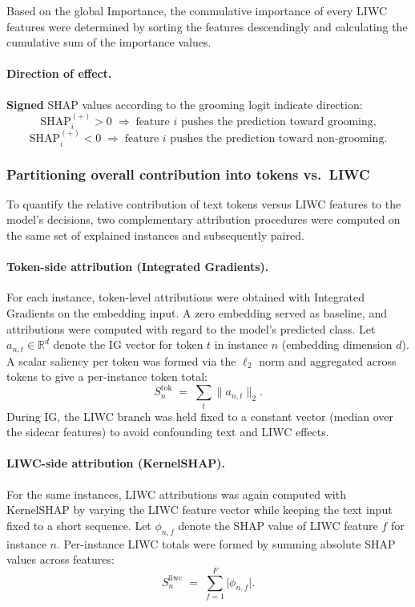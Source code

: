 Based on the global Importance, the commulative importance of every LIWC features were determined by sorting the features descendingly and calculating the cumulative sum of the importance values. 

\paragraph{Direction of effect.}
\textbf{Signed} SHAP values according to the grooming logit indicate direction:
\[
\mathrm{SHAP}^{(+)}_{i} > 0 \;\Rightarrow\; \text{feature } i \text{ pushes the prediction toward grooming,}
\]
\[
\mathrm{SHAP}^{(+)}_{i} < 0 \;\Rightarrow\; \text{feature } i \text{ pushes the prediction toward non-grooming.}
\]

\subsubsection{Partitioning overall contribution into tokens vs.\ LIWC}\label{sec:token_vs_liwc_share}

To quantify the relative contribution of text tokens versus LIWC features to the model's decisions, two complementary attribution procedures were computed on the same set of explained instances and subsequently paired.

\paragraph{Token-side attribution (Integrated Gradients).}
For each instance, token-level attributions were obtained with Integrated Gradients on the embedding input.
A zero embedding served as baseline, and attributions were computed with regard to the model's predicted class.
Let $a_{n,t}\in\mathbb{R}^d$ denote the IG vector for token $t$ in instance $n$ (embedding dimension $d$).
A scalar saliency per token was formed via the $\ell_2$ norm and aggregated across tokens to give a per-instance token total:
\[
S^{\mathrm{tok}}_{n}
\;=\;
\sum_{t} \lVert a_{n,t}\rVert_2.
\]
During IG, the LIWC branch was held fixed to a constant vector (median over the sidecar features) to avoid confounding text and LIWC effects.

\paragraph{LIWC-side attribution (KernelSHAP).}
For the same instances, LIWC attributions was again computed with KernelSHAP by varying the LIWC feature vector while keeping the text input fixed to a short sequence.
Let $\phi_{n,f}$ denote the SHAP value of LIWC feature $f$ for instance $n$.
Per-instance LIWC totals were formed by summing absolute SHAP values across features:
\[
S^{\mathrm{liwc}}_{n}
\;=\;
\sum_{f=1}^{F} \lvert \phi_{n,f}\rvert .
\]


